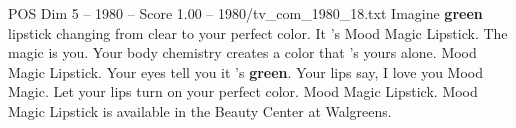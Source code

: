 \begin{textsample}{POS Dim 5 – 1980 – Score 1.00 – 1980/tv\_com\_1980\_18.txt}  \label{ex:f5_pos_013}
Imagine \textbf{green} lipstick changing from clear to your perfect color.
It 's Mood Magic Lipstick.
The magic is you.
Your body chemistry creates a color that 's yours alone.
Mood Magic Lipstick.
Your eyes tell you it 's \textbf{green}.
Your lips say, I love you Mood Magic.
Let your lips turn on your perfect color.
Mood Magic Lipstick.
Mood Magic Lipstick is available in the Beauty Center at Walgreens.

\end{textsample}
